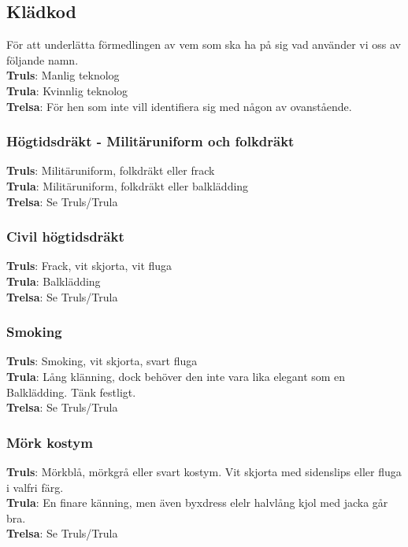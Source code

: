 \subsection*{Klädkod}
För att underlätta förmedlingen av vem som ska ha på sig vad använder vi oss av följande namn.\\

\textbf{Truls}: Manlig teknolog\\
\textbf{Trula}: Kvinnlig teknolog\\
\textbf{Trelsa}: För hen som inte vill identifiera sig med någon av ovanstående.

\subsubsection*{Högtidsdräkt - Militäruniform och folkdräkt}

\textbf{Truls}: Militäruniform, folkdräkt eller frack\\
\textbf{Trula}: Militäruniform, folkdräkt eller balklädding\\
\textbf{Trelsa}: Se Truls/Trula

\subsubsection*{Civil högtidsdräkt}

\textbf{Truls}: Frack, vit skjorta, vit fluga\\
\textbf{Trula}: Balklädding\\
\textbf{Trelsa}: Se Truls/Trula

\subsubsection*{Smoking}
\textbf{Truls}: Smoking, vit skjorta, svart fluga\\
\textbf{Trula}: Lång klänning, dock behöver den inte vara lika elegant som en Balklädding. Tänk festligt.\\
\textbf{Trelsa}: Se Truls/Trula

\subsubsection*{Mörk kostym}
\textbf{Truls}: Mörkblå, mörkgrå eller svart kostym. Vit skjorta med sidenslips eller fluga i valfri färg.\\
\textbf{Trula}: En finare känning, men även byxdress elelr halvlång kjol med jacka går bra.\\
\textbf{Trelsa}: Se Truls/Trula

